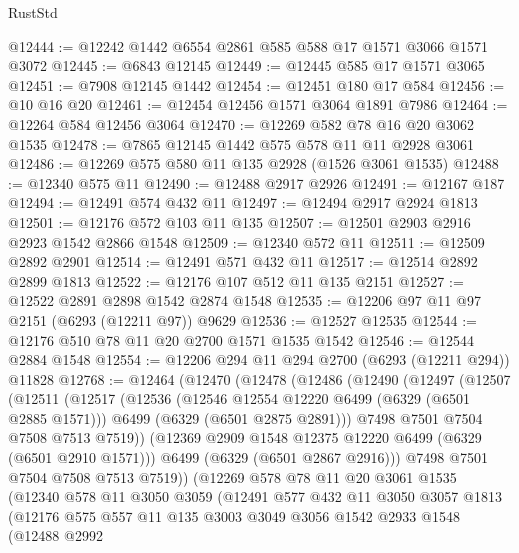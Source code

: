 \begin{lexlean}{RustStd}
\begin{coremodule}
{\begin{coremodule}
{{{{{{{{{{{{{{{{{{{{{{{{{{{{{{{{{{{@12444 := @12242 @1442 @6554 @2861 @585 @588 @17 @1571 @3066 @1571 @3072
@12445 := @6843 @12145
@12449 := @12445 @585 @17 @1571 @3065
@12451 := @7908 @12145 @1442
@12454 := @12451 @180 @17 @584
@12456 := @10 @16 @20
@12461 := @12454 @12456 @1571 @3064 @1891 @7986
@12464 := @12264 @584 @12456 @3064
@12470 := @12269 @582 @78 @16 @20 @3062 @1535
@12478 := @7865 @12145 @1442 @575 @578 @11 @11 @2928 @3061
@12486 := @12269 @575 @580 @11 @135 @2928 (@1526 @3061 @1535)
@12488 := @12340 @575 @11
@12490 := @12488 @2917 @2926
@12491 := @12167 @187
@12494 := @12491 @574 @432 @11
@12497 := @12494 @2917 @2924 @1813
@12501 := @12176 @572 @103 @11 @135
@12507 := @12501 @2903 @2916 @2923 @1542 @2866 @1548
@12509 := @12340 @572 @11
@12511 := @12509 @2892 @2901
@12514 := @12491 @571 @432 @11
@12517 := @12514 @2892 @2899 @1813
@12522 := @12176 @107 @512 @11 @135 @2151
@12527 := @12522 @2891 @2898 @1542 @2874 @1548
@12535 := @12206 @97 @11 @97 @2151 (@6293 (@12211 @97)) @9629
@12536 := @12527 @12535
@12544 := @12176 @510 @78 @11 @20 @2700 @1571 @1535 @1542
@12546 := @12544 @2884 @1548
@12554 := @12206 @294 @11 @294 @2700 (@6293 (@12211 @294)) @11828
@12768 := @12464
    (@12470
      (@12478
        (@12486
          (@12490
            (@12497
              (@12507
                (@12511
                  (@12517
                    (@12536
                      (@12546 @12554 @12220 @6499 (@6329 (@6501 @2885 @1571)))
                      @6499
                      (@6329 (@6501 @2875 @2891)))
                    @7498
                    @7501
                    @7504
                    @7508
                    @7513
                    @7519))
                (@12369 @2909 @1548 @12375 @12220 @6499 (@6329 (@6501 @2910 @1571)))
                @6499
                (@6329 (@6501 @2867 @2916)))
              @7498
              @7501
              @7504
              @7508
              @7513
              @7519))
          (@12269
            @578
            @78
            @11
            @20
            @3061
            @1535
            (@12340
              @578
              @11
              @3050
              @3059
              (@12491
                @577
                @432
                @11
                @3050
                @3057
                @1813
                (@12176
                  @575
                  @557
                  @11
                  @135
                  @3003
                  @3049
                  @3056
                  @1542
                  @2933
                  @1548
                  (@12488
                    @2992
}}}}}}}}}}}}}}}}}}}}}}}}}}}}}}}}}}}
\end{coremodule}}
\end{coremodule}
\end{lexlean}

